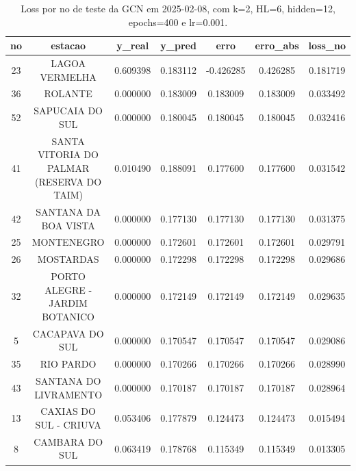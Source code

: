 \begin{table}[h]
\centering
\caption{Loss por no de teste da GCN em 2025-02-08, com k=2, HL=6, hidden=12, epochs=400 e lr=0.001.}
\label{tab:gcn_loss_k2_hl6_h12_e400_d20250208}
\begin{tabular}{ccccccc}
\toprule
no & estacao & y\_real & y\_pred & erro & erro\_abs & loss\_no \\
\midrule
23 & LAGOA VERMELHA & 0.609398 & 0.183112 & -0.426285 & 0.426285 & 0.181719 \\
36 & ROLANTE & 0.000000 & 0.183009 & 0.183009 & 0.183009 & 0.033492 \\
52 & SAPUCAIA DO SUL & 0.000000 & 0.180045 & 0.180045 & 0.180045 & 0.032416 \\
41 & SANTA VITORIA DO PALMAR (RESERVA DO TAIM) & 0.010490 & 0.188091 & 0.177600 & 0.177600 & 0.031542 \\
42 & SANTANA DA BOA VISTA & 0.000000 & 0.177130 & 0.177130 & 0.177130 & 0.031375 \\
25 & MONTENEGRO & 0.000000 & 0.172601 & 0.172601 & 0.172601 & 0.029791 \\
26 & MOSTARDAS & 0.000000 & 0.172298 & 0.172298 & 0.172298 & 0.029686 \\
32 & PORTO ALEGRE - JARDIM BOTANICO & 0.000000 & 0.172149 & 0.172149 & 0.172149 & 0.029635 \\
5 & CACAPAVA DO SUL & 0.000000 & 0.170547 & 0.170547 & 0.170547 & 0.029086 \\
35 & RIO PARDO & 0.000000 & 0.170266 & 0.170266 & 0.170266 & 0.028990 \\
43 & SANTANA DO LIVRAMENTO & 0.000000 & 0.170187 & 0.170187 & 0.170187 & 0.028964 \\
13 & CAXIAS DO SUL - CRIUVA & 0.053406 & 0.177879 & 0.124473 & 0.124473 & 0.015494 \\
8 & CAMBARA DO SUL & 0.063419 & 0.178768 & 0.115349 & 0.115349 & 0.013305 \\
\bottomrule
\end{tabular}
\end{table}
